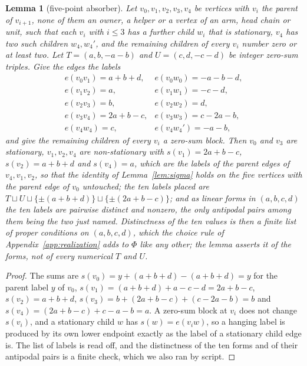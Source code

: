 \documentclass[11pt,a4paper]{article}
\theoremstyle{plain}
\newtheorem{lemma}[theorem]{Lemma}
\theoremstyle{definition}
\theoremstyle{remark}
\begin{document}
\begin{lemma}[five-point absorber]\label{lem:absorber}
Let $v_0,v_1,v_2,v_3,v_4$ be vertices with $v_i$ the parent of $v_{i+1}$, none
of them an owner, a helper or a vertex of an arm, head chain or unit, such
that each $v_i$ with $i\le 3$ has a further child $w_i$ that is stationary,
$v_4$ has two such children $w_4,w_4'$, and the remaining children of every
$v_i$ number zero or at least two.  Let $T=(a,b,-a-b)$ and $U=(c,d,-c-d)$ be
integer zero-sum triples.  Give the edges the labels
\[
\begin{array}{lll}
e(v_0v_1)=a+b+d, & e(v_0w_0)=-a-b-d, \\
e(v_1v_2)=a,     & e(v_1w_1)=-c-d,   \\
e(v_2v_3)=b,     & e(v_2w_2)=d,      \\
e(v_3v_4)=2a+b-c,& e(v_3w_3)=c-2a-b, \\
e(v_4w_4)=c,     & e(v_4w_4')=-a-b,
\end{array}
\]
and give the remaining children of every $v_i$ a zero-sum block.  Then $v_0$
and $v_3$ are stationary, $v_1,v_2,v_4$ are non-stationary with
$s(v_1)=2a+b-c$, $s(v_2)=a+b+d$ and $s(v_4)=a$, which are the labels of the
parent edges of $v_4,v_1,v_2$, so that the identity of Lemma~\ref{lem:sigma}
holds on the five vertices with the parent edge of $v_0$ untouched; the ten
labels placed are $T\sqcup U\sqcup\{\pm(a+b+d)\}\sqcup\{\pm(2a+b-c)\}$; and as
linear forms in $(a,b,c,d)$ the ten labels are pairwise distinct and nonzero,
the only antipodal pairs among them being the two just named.  Distinctness of
the ten \emph{values} is then a finite list of proper conditions on
$(a,b,c,d)$, which the choice rule of Appendix~\ref{app:realization} adds to
$\Phi$ like any other; the lemma asserts it of the forms, not of every
numerical $T$ and $U$.
\end{lemma}

\begin{proof}
The sums are $s(v_0)=y+(a+b+d)-(a+b+d)=y$ for the parent label $y$ of $v_0$,
$s(v_1)=(a+b+d)+a-c-d=2a+b-c$, $s(v_2)=a+b+d$,
$s(v_3)=b+(2a+b-c)+(c-2a-b)=b$ and $s(v_4)=(2a+b-c)+c-a-b=a$.  A zero-sum
block at $v_i$ does not change $s(v_i)$, and a stationary child $w$ has
$s(w)=e(v_iw)$, so a hanging label is produced by its own lower endpoint
exactly as the label of a stationary child edge is.  The list of labels is
read off, and the distinctness of the ten forms and of their antipodal pairs
is a finite check, which we also ran by script.
\end{proof}
\end{document}
